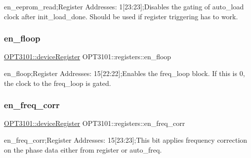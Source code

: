 en\+\_\+eeprom\+\_\+read;Register Addresses\+: 1\mbox{[}23\+:23\mbox{]};Disables the gating of auto\+\_\+load clock after init\+\_\+load\+\_\+done. Should be used if register triggering has to work. 

\mbox{\label{class_o_p_t3101_1_1registers_acac402a36d4a6b3e8447cbfea307f46e}} 
\subsubsection{\texorpdfstring{en\+\_\+floop}{en\_floop}}
{\footnotesize\ttfamily \mbox{\hyperlink{class_o_p_t3101_1_1device_register}{O\+P\+T3101\+::device\+Register}} O\+P\+T3101\+::registers\+::en\+\_\+floop}



en\+\_\+floop;Register Addresses\+: 15\mbox{[}22\+:22\mbox{]};Enables the freq\+\_\+loop block. If this is \textquotesingle{}0\textquotesingle{}, the clock to the freq\+\_\+loop is gated. 

\mbox{\label{class_o_p_t3101_1_1registers_a7d1b46e26e943ba29294904855c83871}} 
\subsubsection{\texorpdfstring{en\+\_\+freq\+\_\+corr}{en\_freq\_corr}}
{\footnotesize\ttfamily \mbox{\hyperlink{class_o_p_t3101_1_1device_register}{O\+P\+T3101\+::device\+Register}} O\+P\+T3101\+::registers\+::en\+\_\+freq\+\_\+corr}



en\+\_\+freq\+\_\+corr;Register Addresses\+: 15\mbox{[}23\+:23\mbox{]};This bit applies frequency correction on the phase data either from register or auto\+\_\+freq. 

\mbox{\label{class_o_p_t3101_1_1registers_a98029ccfd8f7c1c326f30f0d4e96eee2}} 
